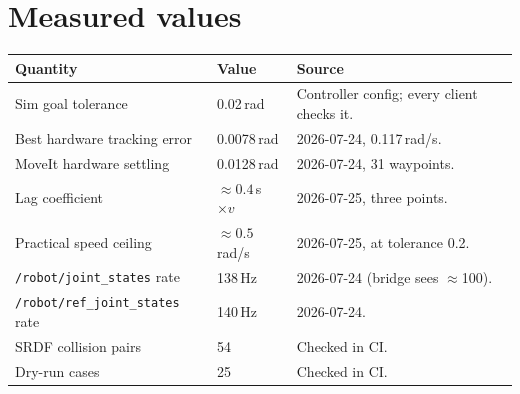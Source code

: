 \section{Measured values}

\begin{table}[h]
\centering
\small
\begin{tabularx}{\linewidth}{@{}llX@{}}
\toprule
\textbf{Quantity} & \textbf{Value} & \textbf{Source} \\
\midrule
Sim goal tolerance & 0.02\,rad & Controller config; every client checks it. \\
Best hardware tracking error & 0.0078\,rad & 2026-07-24, 0.117\,rad/s. \\
MoveIt hardware settling & 0.0128\,rad & 2026-07-24, 31 waypoints. \\
Lag coefficient & $\approx 0.4$\,s $\times v$ & 2026-07-25, three points. \\
Practical speed ceiling & $\approx 0.5$\,rad/s & 2026-07-25, at tolerance 0.2. \\
\texttt{/robot/joint\_states} rate & 138\,Hz & 2026-07-24 (bridge sees $\approx$100). \\
\texttt{/robot/ref\_joint\_states} rate & 140\,Hz & 2026-07-24. \\
SRDF collision pairs & 54 & Checked in CI. \\
Dry-run cases & 25 & Checked in CI. \\
\bottomrule
\end{tabularx}
\end{table}
